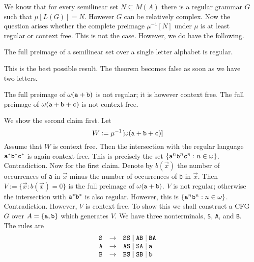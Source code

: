We know that for every semilinear set $N \subseteq M(A)$ there
is a regular grammar $G$ such that $\mu[L(G)] = N$. However
$G$ can be relatively complex. Now the question arises whether
the complete preimage $\mu^{-1}[N]$ under $\mu$ is at least
regular or context free. This is not the case. However, we
do have the following.
\begin{thm}
\label{thm:urbild}
The full preimage of a semilinear set over a single letter
alphabet is regular.
\end{thm}
This is the best possible result. The theorem becomes false as soon
as we have two letters.
\begin{thm}
The full preimage of $\omega (\mbox{\tt a} + \mbox{\tt b})$
is not regular; it is however context free. The full
preimage of $\omega (\mbox{\tt a} + \mbox{\tt b} + \mbox{\tt c})$
is not context free.
\end{thm}
\proofbeg
We show the second claim first. Let
\begin{equation}
W := \mu^{-1}[\omega (\mbox{\tt a} + \mbox{\tt b} +
\mbox{\tt c})] 
\end{equation}
Assume that $W$ is context free. Then the intersection with the
regular language $\mbox{\tt a}^{\ast}\mbox{\tt b}^{\ast}
\mbox{\tt c}^{\ast}$ is again context free. This is precisely
the set $\{\mbox{\tt a}^n \mbox{\tt b}^n \mbox{\tt c}^n : n \in %
\omega\}$. Contradiction. Now for the first claim. Denote by
$b(\vec{x})$ the number of occurrences of {\tt a} in $\vec{x}$
minus the number of occurrences of {\tt b} in $\vec{x}$. Then
$V := \{\vec{x} : b(\vec{x}) = 0\}$ is the full preimage of
$\omega (\mbox{\tt a} + \mbox{\tt b})$. $V$ is not regular;
otherwise the intersection with $\mbox{\tt a}^{\ast} %
\mbox{\tt b}^{\ast}$ is also regular. However, this is 
$\{\mbox{\tt a}^n \mbox{\tt b}^n : n \in \omega\}$.
Contradiction. However, $V$ is context free. To show this we 
shall construct a CFG $G$ over $A = \{\mbox{\tt a}, \mbox{\tt b}\}$ 
which generates $V$. We have three
nonterminals, {\tt S}, {\tt A}, and {\tt B}. The rules are
\begin{equation}
\begin{array}{l@{\quad\pf\quad}l}
\mbox{\tt S} & \mbox{\tt SS} \mid \mbox{\tt AB} \mid \mbox{\tt BA}
    \\
\mbox{\tt A} & \mbox{\tt AS} \mid \mbox{\tt SA} \mid \mbox{\tt a} \\
\mbox{\tt B} & \mbox{\tt BS} \mid \mbox{\tt SB} \mid \mbox{\tt b} \\
\end{array}
\end{equation}
